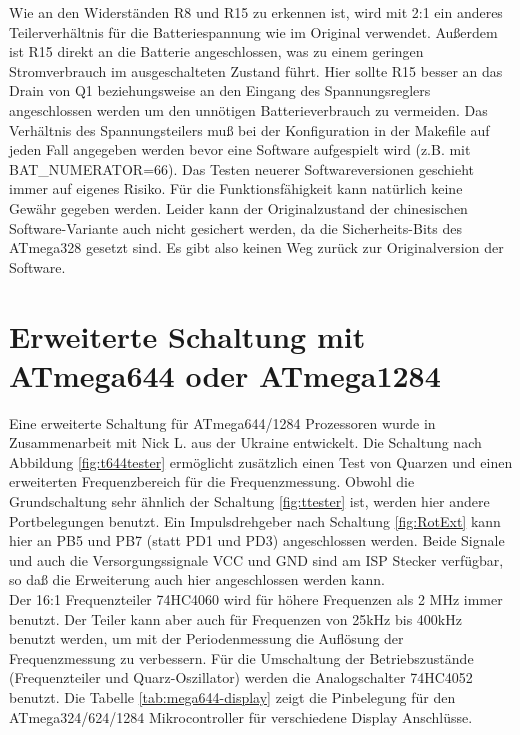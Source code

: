 Wie an den Widerständen R8 und R15 zu erkennen ist, 
wird mit 2:1 ein anderes Teilerverhältnis für die Batteriespannung wie im Original verwendet.
Außerdem ist R15 direkt an die Batterie angeschlossen, was zu einem geringen Stromverbrauch im
ausgeschalteten Zustand führt. Hier sollte R15 besser an das Drain von Q1 beziehungsweise an den
Eingang des Spannungsreglers angeschlossen werden um den unnötigen Batterieverbrauch zu vermeiden.
Das Verhältnis des Spannungsteilers muß bei der Konfiguration in der Makefile auf jeden Fall angegeben
werden bevor eine Software aufgespielt wird (z.B. mit BAT\_NUMERATOR=66).
Das Testen neuerer Softwareversionen geschieht immer auf eigenes Risiko.
Für die Funktionsfähigkeit kann natürlich keine Gewähr gegeben werden.
Leider kann der Originalzustand der chinesischen Software-Variante auch nicht gesichert werden,
da die Sicherheits-Bits des ATmega328 gesetzt sind.
Es gibt also keinen Weg zurück zur Originalversion der Software. 

\section{Erweiterte Schaltung mit ATmega644 oder ATmega1284}

Eine erweiterte Schaltung für ATmega644/1284 Prozessoren wurde in Zusammenarbeit mit Nick L. aus
der Ukraine entwickelt. Die Schaltung nach Abbildung \ref{fig:t644tester} ermöglicht zusätzlich
einen Test von Quarzen und einen erweiterten Frequenzbereich für die Frequenzmessung.
Obwohl die Grundschaltung sehr ähnlich der Schaltung \ref{fig:ttester} ist, werden hier
andere Portbelegungen benutzt.
Ein Impulsdrehgeber nach Schaltung \ref{fig:RotExt} kann hier an PB5 und PB7 (statt PD1 und PD3) angeschlossen werden.
Beide Signale und auch die Versorgungssignale VCC und GND sind am ISP Stecker verfügbar,
so daß die Erweiterung auch hier angeschlossen werden kann.\\

Der 16:1 Frequenzteiler 74HC4060 wird für höhere Frequenzen als 2 MHz immer benutzt.
Der Teiler kann aber auch für Frequenzen von 25kHz bis 400kHz benutzt werden, um mit der
Periodenmessung die Auflösung der Frequenzmessung zu verbessern.
Für die Umschaltung der Betriebszustände (Frequenzteiler und Quarz-Oszillator) werden
die Analogschalter 74HC4052 benutzt.
Die Tabelle \ref{tab:mega644-display} zeigt die Pinbelegung für den ATmega324/624/1284 Mikrocontroller für verschiedene Display Anschlüsse.


